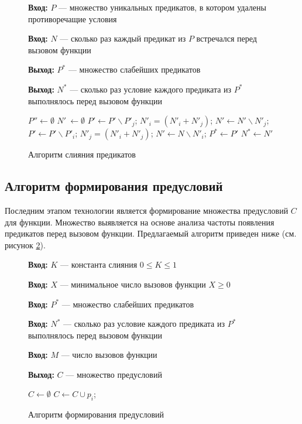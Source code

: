 \begin{figure}[h!]
\textbf{Вход:} $P$ --- множество уникальных предикатов, в котором удалены противоречащие условия

\textbf{Вход:} $N$ --- сколько раз каждый предикат из $P$ встречался перед вызовом функции

\textbf{Выход:} $P^*$ --- множество слабейших предикатов

\textbf{Выход:} $N^*$ --- сколько раз условие каждого предиката из $P^*$ выполнялось перед вызовом функции

\begin{algorithmic}[1]
\State $P'' \leftarrow \emptyset$
\State $N'\ \leftarrow \emptyset$
			\State $P' \leftarrow P' \backslash P'_j$;
			\State $N'_i = (N'_i + N'_j)$;
			\State $N' \leftarrow N' \backslash N'_j$;
		\Else 
				\State $P' \leftarrow P' \backslash P'_i$;
				\State $N'_j = (N'_i + N'_j)$;
				\State $N' \leftarrow N \backslash N'_i$;
    			\EndIf
    		\EndIf
    \EndFor
\EndFor
\State $P^* \leftarrow P'$
\State $N^* \leftarrow N'$
\end{algorithmic}
\caption{Алгоритм слияния предикатов}
\label{image:megringAlgoritm}
\end{figure}

\subsection{Алгоритм формирования предусловий}
Последним этапом технологии является формирование множества предусловий $C$ для функции. Множество выявляется на основе анализа частоты появления предикатов перед вызовом функции. Предлагаемый
алгоритм приведен ниже (см. рисунок \ref{image:extractionAlgoritm}).
\begin{figure}[h!]
\textbf{Вход:} $K$ --- константа слияния $0 \le K \le 1$

\textbf{Вход:} $X$ --- минимальное число вызовов функции $X \ge 0$

\textbf{Вход:} $P^*$ --- множество слабейших предикатов

\textbf{Вход:} $N^*$ --- сколько раз условие каждого предиката из $P^*$ выполнялось перед вызовом функции

\textbf{Вход:} $M$ --- число вызовов функции

\textbf{Выход:} $C$ --- множество предусловий
\begin{algorithmic}[1]
\State $C \leftarrow \emptyset$
	\State \Return
\EndIf
{}
	\State $C \gets C \cup p_i$;
    \EndIf
\EndFor
\end{algorithmic}
\caption{Алгоритм формирования предусловий}
\label{image:extractionAlgoritm}
\end{figure}


